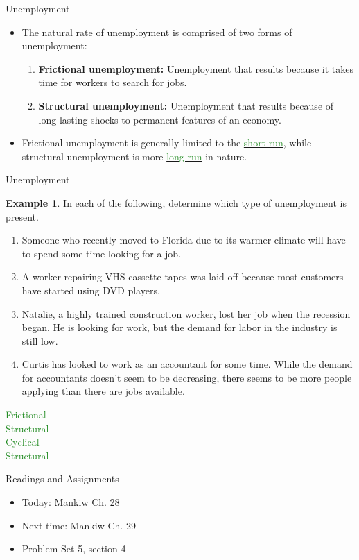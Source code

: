\documentclass[xcolor={dvipsnames},pdf, hyperref={colorlinks=true, citecolor=ForestGreen, linkcolor=BlueViolet, urlcolor=Magenta}]{beamer}
\theoremstyle{definition}
\newtheorem{exmp}{Example}[section]
\newcommand{\defn}[1]{\textbf{#1}}
\newcommand{\ddp}[1]{{\textcolor{ForestGreen}{#1}}}
\newcommand{\dd}[1]{{\underline{\textcolor{ForestGreen}{#1}}}}
\begin{document}
\begin{frame}{Unemployment}
\begin{itemize}
	\item The natural rate of unemployment is comprised of two forms of unemployment:
	\begin{enumerate}
		\item \defn{Frictional unemployment:} Unemployment that results because it takes time for workers to search for jobs.
		\item \defn{Structural unemployment:} Unemployment that results because of long-lasting shocks to permanent features of an economy.
	\end{enumerate}
	
	\item Frictional unemployment is generally limited to the \dd{short run}, while structural unemployment is more \dd{long run} in nature.
\end{itemize}
\end{frame}



\begin{frame}{Unemployment}
\scriptsize
\begin{exmp}
	
	In each of the following, determine which type of unemployment is present.
	
	\begin{enumerate}
		\item Someone who recently moved to Florida due to its warmer climate will have to spend some time looking for a job. 
		\item A worker repairing VHS cassette tapes was laid off because most customers have started using DVD players. 
		\item Natalie, a highly trained construction worker, lost her job when the recession began. He is looking for work, but the demand for labor in the industry is still low.
	
		\item Curtis has looked to work as an accountant for some time. While the demand for accountants doesn't seem to be decreasing, there seems to be more people applying than there are jobs available. 
		
	\end{enumerate}
\end{exmp}

\ddp{\pause Frictional \\
\pause Structural \\
\pause Cyclical \\
\pause Structural}
\end{frame}

\begin{frame}{Readings and Assignments}
\begin{itemize}
	\item Today: Mankiw Ch. 28
	\item Next time: Mankiw Ch. 29
	\item Problem Set 5, section 4
\end{itemize}
\end{frame}
\end{document}
